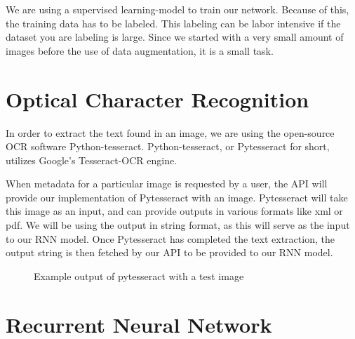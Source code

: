 We are using a supervised learning-model to train our network.
Because of this, the training data has to be labeled.
This labeling can be labor intensive if the dataset you are labeling is large.
Since we started with a very small amount of images before the use of data augmentation, it is a small task.

\section{Optical Character Recognition}\label{sec:OCR}
In order to extract the text found in an image, we are using the open-source OCR software Python-tesseract.
Python-tesseract, or Pytesseract for short, utilizes Google's Tesseract-OCR engine.

When metadata for a particular image is requested by a user, the API will provide our implementation of Pytesseract with an image.
Pytesseract will take this image as an input, and can provide outputs in various formats like xml or pdf.
We will be using the output in string format, as this will serve as the input to our RNN model.
Once Pytesseract has completed the text extraction, the output string is then fetched by our API to be provided to our RNN model.

\begin{figure}[h]
    \caption{Example output of pytesseract with a test image}
    \label{fig:figure3.5}
\end{figure}

\section{Recurrent Neural Network}\label{sec:RNN}

